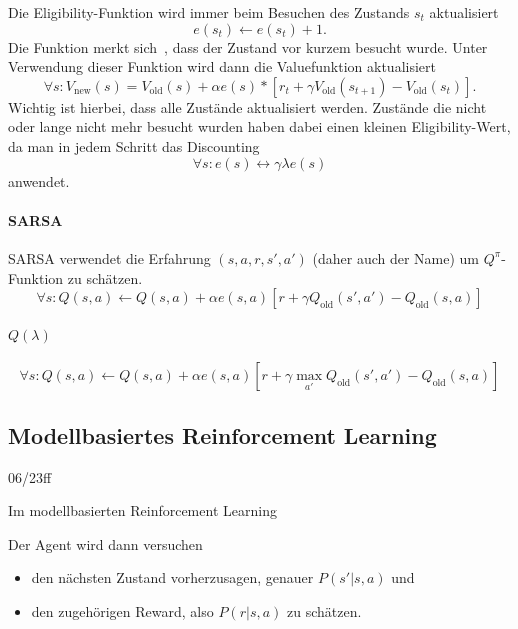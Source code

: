 \documentclass[ngerman]{../LaTeX-Templates/Paper/paper}
\newcommand{\enqo}[1]{\glqq #1\grqq\ }
\begin{document}
Die Eligibility-Funktion wird immer beim Besuchen des Zustands $s_t$ aktualisiert
\begin{equation*}
	e(s_t)\leftarrow e(s_t)+1.
\end{equation*}
Die Funktion \enqo{merkt sich}, dass der Zustand vor kurzem besucht wurde. Unter Verwendung dieser Funktion wird dann die Valuefunktion aktualisiert
\begin{equation*}
	\forall s:V_{\text{new}}(s)= V_{\text{old}}(s)+\alpha e(s)*[r_t+\gamma V_{\text{old}}(s_{t+1})-V_{\text{old}}(s_t)].
\end{equation*}
Wichtig ist hierbei, dass alle Zustände aktualisiert werden.
Zustände die nicht oder lange nicht mehr besucht wurden haben dabei einen kleinen Eligibility-Wert, da man in jedem Schritt das Discounting
\begin{equation*}
	\forall s:e(s)\leftrightarrow \gamma\lambda e(s)
\end{equation*}
anwendet.

\paragraph{SARSA}
SARSA verwendet die Erfahrung $(s,a,r,s',a')$ (daher auch der Name) um $Q^\pi$-Funktion zu schätzen.
\begin{equation*}
	\forall s:Q(s,a)\leftarrow Q(s,a)+\alpha e(s,a)[r+\gamma Q_{\text{old}}(s',a')-Q_{\text{old}}(s,a)]
\end{equation*}

\paragraph{$Q(\lambda)$}
\begin{equation*}
	\forall s:Q(s,a)\leftarrow Q(s,a)+\alpha e(s,a)[r+\gamma \max_{a'} Q_{\text{old}}(s',a')-Q_{\text{old}}(s,a)]
\end{equation*}





\subsection{Modellbasiertes Reinforcement Learning}
06/23ff




Im modellbasierten Reinforcement Learning 

Der Agent wird dann versuchen
\begin{itemize}
	\item den nächsten Zustand vorherzusagen, genauer $P(s'|s,a)$ und
	\item den zugehörigen Reward, also $P(r|s,a)$ zu schätzen.
\end{itemize}
\end{document}
